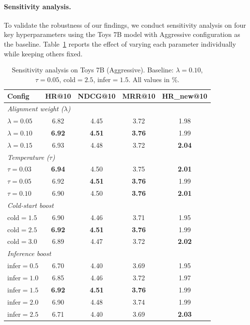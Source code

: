 \documentclass[sigconf,natbib=true]{acmart}
\begin{document}
\paragraph{Sensitivity analysis.}
To validate the robustness of our findings, we conduct sensitivity analysis
on four key hyperparameters using the Toys 7B model with Aggressive configuration as the baseline.
Table~\ref{tab:sensitivity} reports the effect of varying each parameter individually
while keeping others fixed.

\begin{table}[t]
\caption{Sensitivity analysis on Toys 7B (Aggressive). Baseline: $\lambda{=}0.10$, $\tau{=}0.05$, cold${=}2.5$, infer${=}1.5$. All values in \%.}
\label{tab:sensitivity}
\centering
\scriptsize
\begin{tabular}{lcccc}
\toprule
\textbf{Config} & \textbf{HR@10} & \textbf{NDCG@10} & \textbf{MRR@10} & \textbf{HR\_new@10} \\
\midrule
\multicolumn{5}{l}{\footnotesize\textit{Alignment weight ($\lambda$)}} \\
$\lambda{=}0.05$ & 6.82 & 4.45 & 3.72 & 1.98 \\
$\lambda{=}0.10$ & \textbf{6.92} & \textbf{4.51} & \textbf{3.76} & 1.99 \\
$\lambda{=}0.15$ & 6.93 & 4.48 & 3.72 & \textbf{2.04} \\
\midrule
\multicolumn{5}{l}{\footnotesize\textit{Temperature ($\tau$)}} \\
$\tau{=}0.03$ & \textbf{6.94} & 4.50 & 3.75 & \textbf{2.01} \\
$\tau{=}0.05$ & 6.92 & \textbf{4.51} & \textbf{3.76} & 1.99 \\
$\tau{=}0.10$ & 6.90 & 4.50 & \textbf{3.76} & \textbf{2.01} \\
\midrule
\multicolumn{5}{l}{\footnotesize\textit{Cold-start boost}} \\
cold${=}1.5$ & 6.90 & 4.46 & 3.71 & 1.95 \\
cold${=}2.5$ & \textbf{6.92} & \textbf{4.51} & \textbf{3.76} & 1.99 \\
cold${=}3.0$ & 6.89 & 4.47 & 3.72 & \textbf{2.02} \\
\midrule
\multicolumn{5}{l}{\footnotesize\textit{Inference boost}} \\
infer${=}0.5$ & 6.70 & 4.40 & 3.69 & 1.95 \\
infer${=}1.0$ & 6.85 & 4.46 & 3.72 & 1.97 \\
infer${=}1.5$ & \textbf{6.92} & \textbf{4.51} & \textbf{3.76} & 1.99 \\
infer${=}2.0$ & 6.90 & 4.48 & 3.74 & 1.99 \\
infer${=}2.5$ & 6.71 & 4.40 & 3.69 & \textbf{2.03} \\
\bottomrule
\end{tabular}
\end{table}
\end{document}
